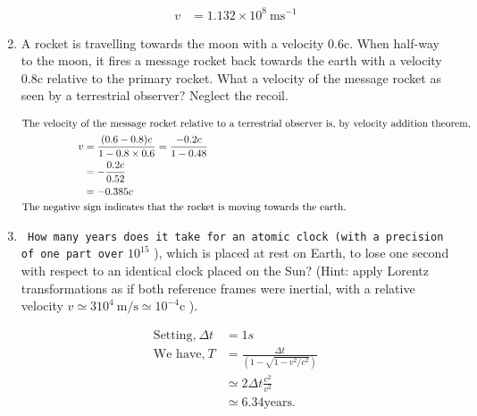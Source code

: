 \begin{enumerate}[ label=\color{ocre}\textbf{\arabic*.}]
\begin{answer}
\begin{align*}
		v&=1.132 \times 10^{8} \mathrm{~ms}^{-1}
		\end{align*}
	\end{answer}
	\item A rocket is travelling towards the moon with a velocity $0.6 \mathrm{c}$. When half-way to the moon, it fires a message rocket back towards the earth with a velocity $0.8 \mathrm{c}$ relative to the primary rocket. What a velocity of the message rocket as seen by a terrestrial observer? Neglect the recoil.
	\begin{answer}
		\begin{align*}
		\intertext{The velocity of the message rocket relative to a terrestrial observer is, by velocity addition theorem,}
		v&=\frac{(0.6-0.8) c}{1-0.8 \times 0.6}=\frac{-0.2 c}{1-0.48}\\
		&=-\frac{0.2 c}{0.52}\\&=-0.385 c\\
		\text{The negative }&\text{sign indicates that the rocket is moving towards the earth.}
		\end{align*}
	\end{answer}

\item \texttt{ How many years does it take for an atomic clock (with a precision of one part over} $10^{15}$ ), which is placed at rest on Earth, to lose one second with respect to an identical clock placed on the Sun? (Hint: apply Lorentz transformations as if both reference frames were inertial, with a relative velocity $v \simeq 310^{4} \mathrm{~m} / \mathrm{s} \simeq 10^{-4} \mathrm{c}$ ).
\begin{answer}
	\begin{align*}
	\text{Setting,}\ \Delta t&=1s\\ \text{We have,}\ T&=\frac{\Delta t}{\left(1-\sqrt{1-v^{2} / c^{2}}\right)} \\& \simeq 2 \Delta t \frac{c^{2}}{v^{2}}\\& \simeq 6.34 \text{years.}
	\end{align*}
\end{answer}
\end{enumerate}




